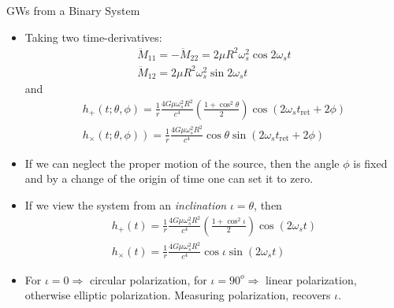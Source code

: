 \documentclass[size=11pt,style=paintings]{powerdot}
\begin{document}
\begin{slide}{GWs from a Binary System}
 \begin{itemize}
 \item Taking two time-derivatives: $$
\begin{array}{l}{\ddot{M}_{11}= -\ddot{M}_{22} =2 \mu R^{2} \omega_{s}^{2} \cos 2 \omega_{s} t} \\ {\ddot{M}_{12}=2 \mu R^{2} \omega_{s}^{2} \sin 2 \omega_{s} t}\end{array}
$$
\vspace{-0.3cm}
and
$$
\begin{array}{l}{h_{+}(t ; \theta, \phi)=\frac{1}{r} \frac{4 G \mu \omega_{s}^{2} R^{2}}{c^{4}}\left(\frac{1+\cos ^{2} \theta}{2}\right) \cos \left(2 \omega_{s} t_{\mathrm{ret}}+2 \phi\right)} \\ {\left.h_{\times}(t ; \theta, \phi)\right)=\frac{1}{r} \frac{4 G \mu \omega_{s}^{2} R^{2}}{c^{4}} \cos \theta \sin \left(2 \omega_{s} t_{\mathrm{ret}}+2 \phi\right)}\end{array}
$$
\item If we can neglect the proper motion of the source, then the angle $\phi$ is fixed and by a change of the origin of time one can set it to zero.
\item If we view the system from an \textit{inclination} $\iota=\theta$, then
$$
\begin{array}{l}{h_{+}(t)=\frac{1}{r} \frac{4 G \mu \omega_{s}^{2} R^{2}}{c^{4}}\left(\frac{1+\cos ^{2} \iota}{2}\right) \cos \left(2 \omega_{s} t\right)} \\ {h_{\times}(t)=\frac{1}{r} \frac{4 G \mu \omega_{s}^{2} R^{2}}{c^{4}} \cos \iota \sin \left(2 \omega_{s} t\right)}\end{array}
$$
\item For $\iota=0 \Rightarrow$ circular polarization, for $\iota=90^{o } \Rightarrow$ linear polarization, otherwise elliptic polarization. Measuring polarization, recovers $\iota$.
 \end{itemize}
 \end{slide}
\end{document}
